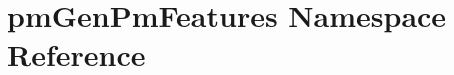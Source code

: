 \hypertarget{namespacepm_gen_pm_features}{\section{pm\-Gen\-Pm\-Features Namespace Reference}
\label{namespacepm_gen_pm_features}
}
